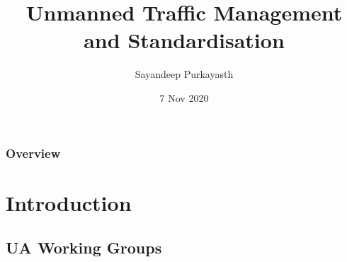 \documentclass[usenames,dvipsnames,aspectratio=169,serif]{beamer}
\title[UTM \& Stdn.]{Unmanned Traffic Management and Standardisation} %
\author{Sayandeep Purkayasth} %
\institute[UAWGs] %
{
   \href{mailto:sayandeep@deepcyan.ai}{sayandeep@deepcyan.ai}  \\ %
   \medskip
   Unmanned Aviation Working Groups
   \footnote{\tiny \faLink \, https://groups.google.com/forum/\#!forum/utm-wg} %
   \footnote{\tiny \faEnvelope[regular] utm-wg@googlegroups.com} %
   \footnote{\tiny \faGit \, https://github.com/utm-working-group} %
}
\date{7 Nov 2020} %
\begin{document}
\begin{frame}
   \titlepage %
\end{frame}

\begin{frame}
   \frametitle{Overview} %
   \tableofcontents %
\end{frame}


\section{Introduction} %

\subsection{UA Working Groups} %
\end{document}
